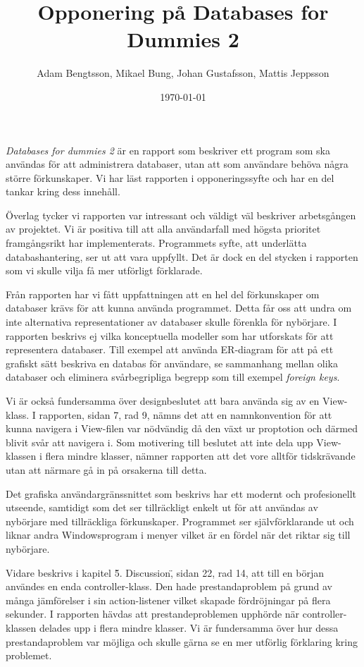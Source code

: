 \documentclass[a4paper, 12pt]{article}
\begin{document}
\title{Opponering på Databases for Dummies 2}
\author{
    Adam Bengtsson, 
    Mikael Bung, 
    Johan Gustafsson, 
    Mattis Jeppsson 
}
\date{\today}
\maketitle
    

\emph{Databases for dummies 2} är en rapport som beskriver ett program som ska användas för att administrera databaser, utan att som användare behöva några större förkunskaper. Vi har läst rapporten i opponeringssyfte och har en del tankar kring dess innehåll.

Överlag tycker vi rapporten var intressant och väldigt väl beskriver arbetsgången av projektet. Vi är positiva till att alla användarfall med högsta prioritet framgångsrikt har implementerats. Programmets syfte, att underlätta databashantering, ser ut att vara uppfyllt. Det är dock en del stycken i rapporten som vi skulle vilja få mer utförligt förklarade.

Från rapporten har vi fått uppfattningen att en hel del förkunskaper om databaser krävs för att kunna använda programmet. Detta får oss att undra om inte alternativa representationer av databaser skulle förenkla för nybörjare. I rapporten beskrivs ej vilka konceptuella modeller som har utforskats för att representera databaser. Till exempel att använda ER-diagram för att på ett grafiskt sätt beskriva en databas för användare, se sammanhang mellan olika databaser och eliminera svårbegripliga begrepp som till exempel \emph{foreign keys}.

Vi är också fundersamma över designbeslutet att bara använda sig av en View-klass. I rapporten, sidan 7, rad 9,  nämns det att en namnkonvention för att kunna navigera i View-filen var nödvändig då den växt ur proptotion och därmed blivit svår att navigera i. Som motivering till beslutet att inte dela upp View-klassen i flera mindre klasser, nämner rapporten att det vore alltför tidskrävande utan att närmare gå in på orsakerna till detta.

Det grafiska användargränssnittet som beskrivs har ett modernt och profesionellt utseende, samtidigt som det ser tillräckligt enkelt ut för att användas av nybörjare med tillräckliga förkunskaper. Programmet ser självförklarande ut och liknar andra Windowsprogram i menyer vilket är en fördel när det riktar sig till nybörjare. 

Vidare beskrivs i kapitel \"5. Discussion\", sidan 22, rad 14, att till en början användes en enda controller-klass. Den hade prestandaproblem på grund av många jämförelser i sin action-listener vilket skapade fördröjningar på flera sekunder. I rapporten hävdas att prestandeproblemen upphörde när controller-klassen delades upp i flera mindre klasser. Vi är fundersamma över hur dessa prestandaproblem var möjliga och skulle gärna se en mer utförlig förklaring kring problemet. 
\end{document}
